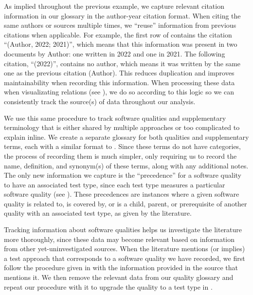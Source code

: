 \ifnotpaper
    \label{record-cites}
    As implied throughout the previous example, we capture relevant citation
    information in our glossary in the author-year citation format. When citing
    the same authors or sources multiple times, we ``reuse'' information from
    previous citations
    when applicable. For example, the first row of 
    contains the citation ``(Author, 2022; 2021)'', which means that this
    information was present in two documents by Author: one written in
    2022 and one in 2021. The following citation, ``(2022)'', contains no author,
    which means it was written by the same one as the previous citation (Author).
    This reduces duplication and improves maintainability when recording this
    information. When processing these data when visualizating relations
    (see ), we do so according to this
    logic  so we can
    consistently track the source(s) of data throughout our analysis.
\fi

\label{qual-supp-procedure}
We use this same procedure to track software qualities and supplementary
terminology that is either shared by multiple approaches or too complicated to
explain inline. We create a separate glossary for both qualities and
supplementary terms, each with a similar format to \ourApproachGlossary.
Since these terms do not have categories, the process of recording them is much
simpler, only requiring us to record the name, definition, and synonym(s) of
these terms, along with any additional notes. The only new information
we capture is the ``precedence'' for a software quality to have an associated
test type, since each test type measures a particular software quality (see
). These precedences are instances where a given software
quality is related to, is covered by, or is a child, parent, or prerequisite
of another quality with an associated test type, as given by the literature.

Tracking information about software qualities helps us investigate the
literature more thoroughly, since these data may become relevant based on
information from other yet-uninvestigated sources. When the literature mentions
(or implies) a test approach that corresponds to a software quality we have
recorded, we first follow the procedure given in 
with the information provided in the source that mentions it. We then remove
the relevant data from our quality glossary and repeat our procedure with it
to upgrade the quality to a test type in \ourApproachGlossary{}.%

